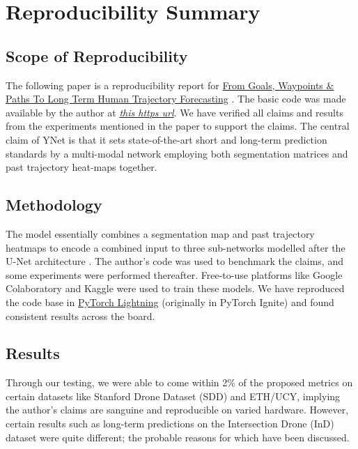 \section*{\centering Reproducibility Summary}

\subsection*{Scope of Reproducibility}

The following paper is a reproducibility report for \href{https://arxiv.org/abs/2012.01526}{From Goals, Waypoints \& Paths To Long Term Human Trajectory Forecasting} \cite{mangalam2021goals}. The basic code was made available by the author at \href{https://github.com/HarshayuGirase/Human-Path-Prediction/tree/master/ynet}{\textit{this https url}}. We have verified all claims and results from the experiments mentioned in the paper to support
the claims. The central claim of YNet is that it sets state-of-the-art short and long-term prediction standards by a multi-modal network employing both segmentation matrices and past trajectory heat-maps together. 


\subsection*{Methodology}

The model essentially combines a segmentation map and past trajectory heatmaps to encode a combined input to three sub-networks modelled after the U-Net architecture \cite{DBLP:journals/corr/RonnebergerFB15}. The author's code was used to benchmark the claims, and some experiments were performed thereafter. Free-to-use platforms like Google Colaboratory and Kaggle were used to train these models. We have reproduced the code base in \href{https://www.pytorchlightning.ai/}{PyTorch Lightning} (originally in PyTorch Ignite) and found consistent results across the board. 

\subsection*{Results}

Through our testing, we were able to come within 2\% of the proposed metrics on certain datasets like Stanford Drone Dataset (SDD) and ETH/UCY, implying the author's claims are sanguine and reproducible on varied hardware. However, certain results such as long-term predictions on the Intersection Drone (InD) dataset were quite different; the probable reasons for which have been discussed.

